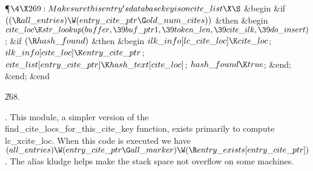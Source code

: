 \Y\P$\4\X269:Make sure this entry's database key is on \\{cite\_list}\X\S$\6
\&{begin} \&{if} $((\R\\{all\_entries})\W(\\{entry\_cite\_ptr}\G\\{old\_num%
\_cites}))$ \1\&{then}\6
\&{begin} $\\{cite\_loc}\K\\{str\_lookup}(\\{buffer},\39\\{buf\_ptr1},\39%
\\{token\_len},\39\\{cite\_ilk},\39\\{do\_insert})$;\6
\&{if} $(\R\\{hash\_found})$ \1\&{then}\6
\&{begin} \6
$\\{ilk\_info}[\\{lc\_cite\_loc}]\K\\{cite\_loc}$;\5
$\\{ilk\_info}[\\{cite\_loc}]\K\\{entry\_cite\_ptr}$;\5
$\\{cite\_list}[\\{entry\_cite\_ptr}]\K\\{hash\_text}[\\{cite\_loc}]$;\6
$\\{hash\_found}\K\\{true}$;\6
\&{end};\2\6
\&{end};\2\6
\&{end}\par
\U268.\fi

.
This module, a simpler version of the
\\{find\_cite\_locs\_for\_this\_cite\_key} function, exists primarily to
compute \\{lc\_xcite\_loc}.  When this code is executed we have
$(\\{all\_entries})\W(\\{entry\_cite\_ptr}\G\\{all\_marker})\W(\R\\{entry%
\_exists}[\\{entry\_cite\_ptr}])$.  The alias kludge helps make the stack
space not overflow on some machines.

